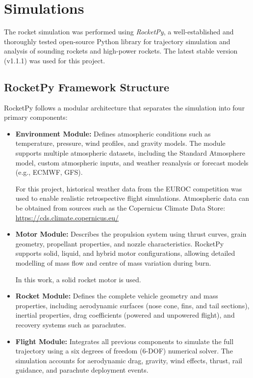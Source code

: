 \section{Simulations}

The rocket simulation was performed using \textit{RocketPy}, a well-established and thoroughly tested open-source Python library for trajectory simulation and analysis of sounding rockets and high-power rockets. The latest stable version (v1.1.1) was used for this project.

\subsection{RocketPy Framework Structure}

RocketPy follows a modular architecture that separates the simulation into four primary components:

\begin{itemize}
    \item \textbf{Environment Module:}  
    Defines atmospheric conditions such as temperature, pressure, wind profiles, and gravity models. The module supports multiple atmospheric datasets, including the Standard Atmosphere model, custom atmospheric inputs, and weather reanalysis or forecast models (e.g., ECMWF, GFS).  

    For this project, historical weather data from the EUROC competition was used to enable realistic retrospective flight simulations. Atmospheric data can be obtained from sources such as the Copernicus Climate Data Store:  
    \url{https://cds.climate.copernicus.eu/}

    \item \textbf{Motor Module:}  
    Describes the propulsion system using thrust curves, grain geometry, propellant properties, and nozzle characteristics. RocketPy supports solid, liquid, and hybrid motor configurations, allowing detailed modelling of mass flow and centre of mass variation during burn.  

    In this work, a solid rocket motor is used.

    \item \textbf{Rocket Module:}  
    Defines the complete vehicle geometry and mass properties, including aerodynamic surfaces (nose cone, fins, and tail sections), inertial properties, drag coefficients (powered and unpowered flight), and recovery systems such as parachutes.

    \item \textbf{Flight Module:}  
    Integrates all previous components to simulate the full trajectory using a six degrees of freedom (6-DOF) numerical solver. The simulation accounts for aerodynamic drag, gravity, wind effects, thrust, rail guidance, and parachute deployment events.
\end{itemize}

